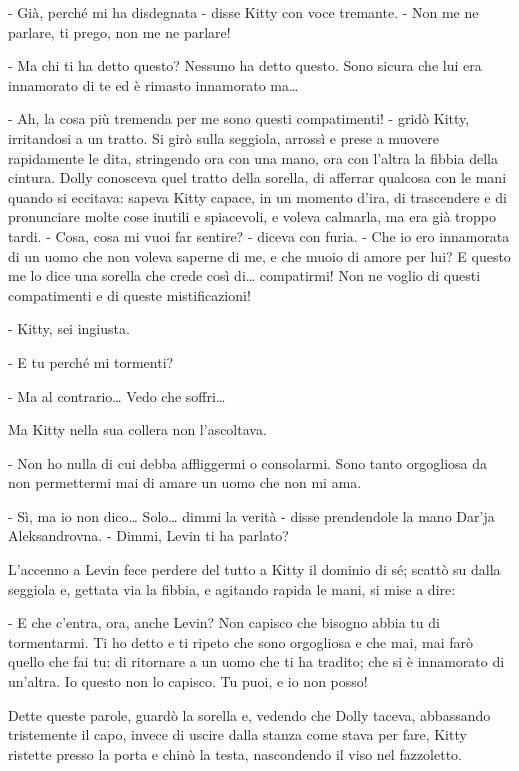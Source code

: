 - Già, perché mi ha disdegnata - disse Kitty con voce tremante. - Non me ne parlare, ti prego, non me ne parlare! 

- Ma chi ti ha detto questo? Nessuno ha detto questo. Sono sicura che lui era innamorato di te ed è rimasto innamorato ma\ldots{} 

- Ah, la cosa più tremenda per me sono questi compatimenti! - gridò Kitty, irritandosi a un tratto. Si girò sulla seggiola, arrossì e prese a muovere rapidamente le dita, stringendo ora con una mano, ora con l'altra la fibbia della cintura. Dolly conosceva quel tratto della sorella, di afferrar qualcosa con le mani quando si eccitava: sapeva Kitty capace, in un momento d'ira, di trascendere e di pronunciare molte cose inutili e spiacevoli, e voleva calmarla, ma era già troppo tardi. - Cosa, cosa mi vuoi far sentire? - diceva con furia. - Che io ero innamorata di un uomo che non voleva saperne di me, e che muoio di amore per lui? E questo me lo dice una sorella che crede così di\ldots{} compatirmi! Non ne voglio di questi compatimenti e di queste mistificazioni! 

- Kitty, sei ingiusta. 

- E tu perché mi tormenti? 

- Ma al contrario\ldots{} Vedo che soffri\ldots{} 

Ma Kitty nella sua collera non l'ascoltava. 

- Non ho nulla di cui debba affliggermi o consolarmi. Sono tanto orgogliosa da non permettermi mai di amare un uomo che non mi ama. 

- Sì, ma io non dico\ldots{} Solo\ldots{} dimmi la verità - disse prendendole la mano Dar'ja Aleksandrovna. - Dimmi, Levin ti ha parlato? 

L'accenno a Levin fece perdere del tutto a Kitty il dominio di sé; scattò su dalla seggiola e, gettata via la fibbia, e agitando rapida le mani, si mise a dire: 

- E che c'entra, ora, anche Levin? Non capisco che bisogno abbia tu di tormentarmi. Ti ho detto e ti ripeto che sono orgogliosa e che mai, mai farò quello che fai tu: di ritornare a un uomo che ti ha tradito; che si è innamorato di un'altra. Io questo non lo capisco. Tu puoi, e io non posso! 

Dette queste parole, guardò la sorella e, vedendo che Dolly taceva, abbassando tristemente il capo, invece di uscire dalla stanza come stava per fare, Kitty ristette presso la porta e chinò la testa, nascondendo il viso nel fazzoletto. 

